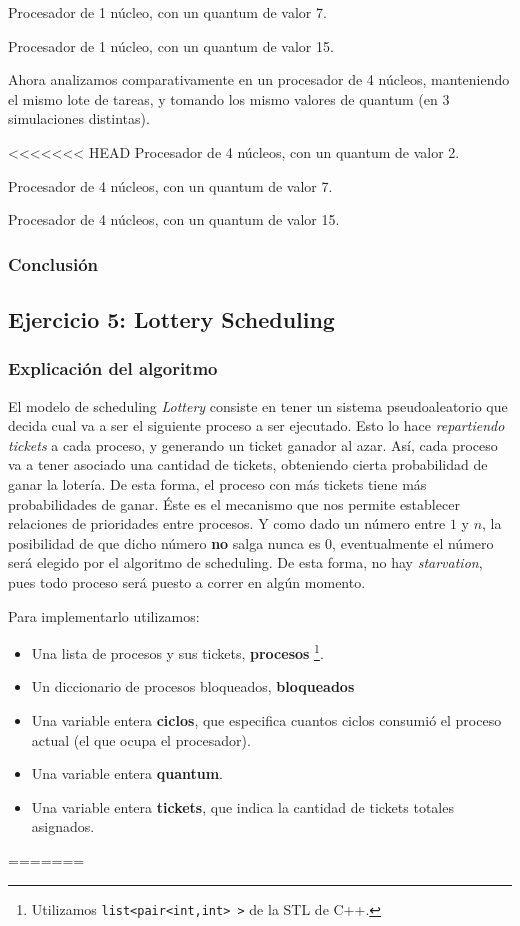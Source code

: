 \documentclass[a4paper]{article}
\begin{document}
Procesador de 1 núcleo, con un quantum de valor 7.

Procesador de 1 núcleo, con un quantum de valor 15.

Ahora analizamos comparativamente en un procesador de 4 núcleos, manteniendo
el mismo lote de tareas, y tomando los mismo valores de quantum (en 3
simulaciones distintas).

<<<<<<< HEAD
Procesador de 4 núcleos, con un quantum de valor 2.

Procesador de 4 núcleos, con un quantum de valor 7.

Procesador de 4 núcleos, con un quantum de valor 15.

\subsubsection{Conclusión}

\subsection{Ejercicio 5: Lottery Scheduling}
\subsubsection{Explicación del algoritmo}
El modelo de scheduling \textit{Lottery} consiste en tener un sistema
pseudoaleatorio que decida cual va a ser el siguiente proceso a ser
ejecutado. Esto lo hace \textit{repartiendo tickets} a cada proceso, y
generando un ticket ganador al azar. Así, cada
proceso va a tener asociado una cantidad de tickets, obteniendo
cierta probabilidad de ganar la lotería. De esta forma, el proceso con más
tickets tiene más probabilidades de ganar. Éste es el mecanismo que nos
permite establecer relaciones de prioridades entre procesos.
Y como dado un número entre $1$ y $n$, la posibilidad de que dicho número
\textbf{no} salga nunca es $0$, eventualmente el número será elegido por el
algoritmo de scheduling. De esta forma, no hay \textit{starvation}, pues
todo proceso será puesto a correr en algún momento.

Para implementarlo utilizamos:
\begin{itemize}
\item Una lista de procesos y sus tickets, \textbf{procesos}
\footnote{Utilizamos \verb|list<pair<int,int> >| de la STL de C++.}.
\item Un diccionario de procesos bloqueados, \textbf{bloqueados}
\item Una variable entera \textbf{ciclos}, que especifica cuantos ciclos
consumió el proceso actual (el que ocupa el procesador).
\item Una variable entera \textbf{quantum}.
\item Una variable entera \textbf{tickets}, que indica la cantidad de
tickets totales asignados.
\end{itemize}
=======
\end{document}
